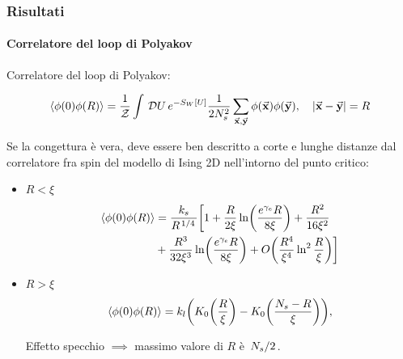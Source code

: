 \documentclass{beamer}
\newcommand{\D}[1]{\,\mathcal{D}#1\,}
\newcommand{\Z}{\mathcal{Z}}
\begin{document}
\begin{frame}
	\frametitle{Risultati}
	\framesubtitle{Correlatore del loop di Polyakov}

	\small
	
	Correlatore del loop di Polyakov:

	\begin{equation*}
		\expval{\phi(0) \phi(R)} = \frac{1}{\Z} \int \D U e^{-S_W[U]} \frac{1}{2N_s^2} \sum_{\va{x}, \va{y}} \phi(\va{x}) \phi(\va{y})
		\qc |\va{x} - \va{y}| = R 
	\end{equation*}

	Se la congettura è vera, deve essere ben descritto a corte e lunghe distanze dal correlatore fra spin del modello di Ising 2D
	nell'intorno del punto critico:

	\begin{itemize}
		\item $R < \xi$
			\begin{equation*} 
				\begin{aligned}
					\expval{\phi(0) \phi(R)} &= \frac{k_s}{R^{\flatfrac{1}{4}}} \biggl[ 1 + \frac{R}{2\xi} \ln(\frac{e^{\gamma_e}R}{8\xi}) + \frac{R^2}{16\xi^2} \\
					&+ \frac{R^3}{32\xi^3} \ln(\frac{e^{\gamma_e}R}{8\xi}) + O\qty(\frac{R^4}{\xi^4}\ln^2\frac{R}{\xi}) \biggr]
				\end{aligned}
			\end{equation*}

		\item $R > \xi$
			\begin{equation*}
				\expval{\phi(0) \phi(R)} = k_l \qty(K_0\qty(\frac{R}{\xi}) - K_0\qty(\frac{N_s - R}{\xi})),
			\end{equation*}

			\alert{Effetto specchio} $\implies$ massimo valore di $R$ è $\flatfrac{N_s}{2}$. 
	\end{itemize}
\end{frame}
\end{document}
